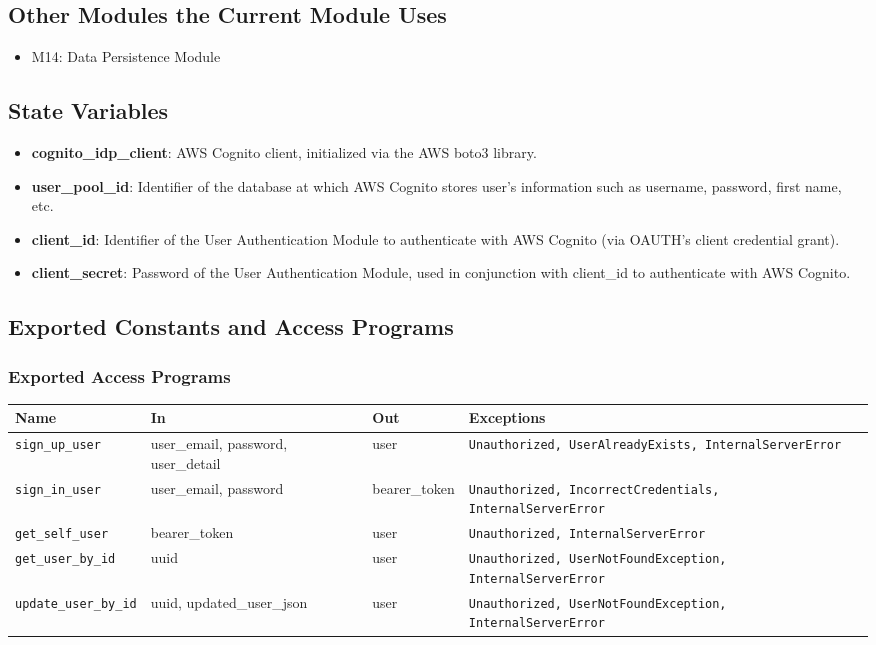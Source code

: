 \documentclass[12pt, titlepage]{article}
\begin{document}
\subsection{Other Modules the Current Module Uses}
\begin{itemize}
    \item M14: Data Persistence Module
\end{itemize}

\subsection{State Variables}
\begin{itemize}
    \item \textbf{cognito\_idp\_client}: AWS Cognito client, initialized via the AWS boto3 library.
    \item \textbf{user\_pool\_id}: Identifier of the database at which AWS Cognito stores user's information such as username, password, first name, etc.
    \item \textbf{client\_id}: Identifier of the User Authentication Module to authenticate with AWS Cognito (via OAUTH's client credential grant).
    \item \textbf{client\_secret}: Password of the User Authentication Module, used in conjunction with client\_id to authenticate with AWS Cognito.
\end{itemize}


\subsection{Exported Constants and Access Programs}
\subsubsection{Exported Access Programs}
\begin{tabular}{|p{4.5cm}|p{3cm}|p{2.5cm}|p{5cm}|}
    \hline
    \textbf{Name} & \textbf{In} & \textbf{Out} & \textbf{Exceptions} \\
    \hline 
    \texttt{sign\_up\_user} & user\_email, password, user\_detail & user & \texttt{Unauthorized, UserAlreadyExists, InternalServerError} \\
    \hline
    \texttt{sign\_in\_user} & user\_email, password & bearer\_token & \texttt{Unauthorized, IncorrectCredentials, InternalServerError} \\
    \hline
    \texttt{get\_self\_user} & bearer\_token & user & \texttt{Unauthorized, InternalServerError} \\
    \hline
    \texttt{get\_user\_by\_id} & uuid & user & \texttt{Unauthorized, UserNotFoundException, InternalServerError} \\
    \hline
    \texttt{update\_user\_by\_id} & uuid, updated\_user\_json & user & \texttt{Unauthorized, UserNotFoundException, InternalServerError} \\
    \hline
\end{tabular}
\end{document}
